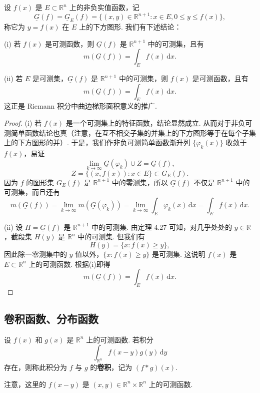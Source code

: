 \documentclass[../../main.tex]{subfiles}%
\begin{document}
\begin{theorem}[积分的几何意义]\label{theorem:积分的几何意义}
设 \( f(x) \) 是 \( E \subset \mathbb{R}^n \) 上的非负实值函数，记
\[
\underline{G}(f) = \underline{G}_E(f) = \{ (x, y) \in \mathbb{R}^{n + 1} : x \in E, 0 \leqslant y \leqslant f(x) \},
\]
称它为 \( y = f(x) \) 在 \( E \) 上的下方图形. 我们有下述结论：

(i) 若 \( f(x) \) 是可测函数，则 \( \underline{G}(f) \) 是 \( \mathbb{R}^{n + 1} \) 中的可测集，且有
\[
m(\underline{G}(f)) = \int_E f(x) \, \mathrm{d}x.
\]

(ii) 若 \( E \) 是可测集，\( \underline{G}(f) \) 是 \( \mathbb{R}^{n + 1} \) 中的可测集，则 \( f(x) \) 是可测函数，且有
\[
m(\underline{G}(f)) = \int_E f(x) \, \mathrm{d}x.
\]
这正是 Riemann 积分中曲边梯形面积意义的推广.
\end{theorem}
\begin{proof}

(i) 若 \( f(x) \) 是一个可测集上的特征函数，结论显然成立. 从而对于非负可测简单函数结论也真（注意，在互不相交子集的并集上的下方图形等于在每个子集上的下方图形的并）. 于是，我们作非负可测简单函数渐升列 \( \{ \varphi_k(x) \} \) 收敛于 \( f(x) \)，易证
\[
\lim_{k \to \infty} \underline{G}(\varphi_k) \cup Z = \underline{G}(f),
\]
\[
Z = \{ (x, f(x)) : x \in E \} \subset G_E(f).
\]
因为 \( f \) 的图形集 \( G_E(f) \) 是 \( \mathbb{R}^{n + 1} \) 中的零测集，所以 \( \underline{G}(f) \) 不仅是 \( \mathbb{R}^{n + 1} \) 中的可测集，而且还有
\[
m(\underline{G}(f)) = \lim_{k \to \infty} m(\underline{G}(\varphi_k)) = \lim_{k \to \infty} \int_E \varphi_k(x) \, \mathrm{d}x = \int_E f(x) \, \mathrm{d}x.
\]

(ii) 设 \( H = \underline{G}(f) \) 是 \( \mathbb{R}^{n + 1} \) 中的可测集. 由定理 4.27 可知，对几乎处处的 \( y \in \mathbb{R} \)，截段集 \( H(y) \) 是 \( \mathbb{R}^n \) 中的可测集. 但我们有
\[
H(y) = \{ x : f(x) \geqslant y \},
\]
因此除一零测集中的 \( y \) 值以外，\( \{ x : f(x) \geqslant y \} \) 是可测集. 这说明 \( f(x) \) 是 \( E \subset \mathbb{R}^n \) 上的可测函数. 根据(i)即得
\[
m(\underline{G}(f)) = \int_E f(x) \, \mathrm{d}x.
\]

\end{proof}



\subsection{卷积函数、分布函数}

\begin{definition}[卷积]
设 \( f(x) \) 和 \( g(x) \) 是 \( \mathbb{R}^n \) 上的可测函数. 若积分
\[
\int_{\mathbb{R}^n} f(x - y) g(y) \, \mathrm{d}y
\]
存在，则称此积分为 \( f \) 与 \( g \) 的\textbf{卷积}，记为 \( (f * g)(x) \).
\end{definition}
\begin{remark}
注意，这里的 \( f(x - y) \) 是 \( (x, y) \in \mathbb{R}^n \times \mathbb{R}^n \) 上的可测函数.
\end{remark}
\end{document}
